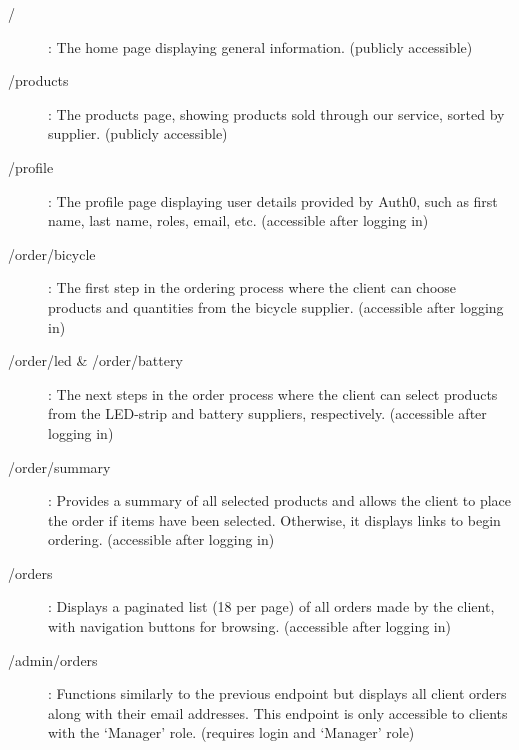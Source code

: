 \documentclass[10pt,a4paper,kul]{kulakarticle} %
\begin{document}
	\begin{description}
		\item[/]: The home page displaying general information. (publicly accessible)
		\item[/products]: The products page, showing products sold through our service, sorted by supplier. (publicly accessible)
		\item[/profile]: The profile page displaying user details provided by Auth0, such as first name, last name, roles, email, etc. (accessible after logging in)
		\item[/order/bicycle]: The first step in the ordering process where the client can choose products and quantities from the bicycle supplier. (accessible after logging in)
		\item[/order/led \& /order/battery]: The next steps in the order process where the client can select products from the LED-strip and battery suppliers, respectively. (accessible after logging in)
		\item[/order/summary]: Provides a summary of all selected products and allows the client to place the order if items have been selected. Otherwise, it displays links to begin ordering. (accessible after logging in)
		\item[/orders]: Displays a paginated list (18 per page) of all orders made by the client, with navigation buttons for browsing. (accessible after logging in)
		\item[/admin/orders]: Functions similarly to the previous endpoint but displays all client orders along with their email addresses. This endpoint is only accessible to clients with the `Manager' role. (requires login and `Manager' role)
	\end{description}
	
\end{document}
